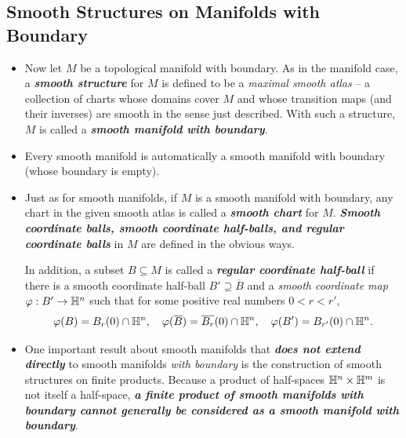\documentclass[11pt]{article}
\begin{document}
\subsection{Smooth Structures on Manifolds with Boundary}
\begin{itemize}
\item \begin{definition}
Now let $M$ be a topological manifold with boundary. As in the manifold case, a \emph{\textbf{smooth structure}} for $M$ is defined to be a \emph{maximal smooth atlas} -- a collection of charts whose domains cover $M$ and whose transition maps (and their inverses) are smooth in the sense just described. With such a structure, $M$ is called a \emph{\textbf{smooth manifold with boundary}}. 
\end{definition}

\item Every smooth manifold is automatically a smooth manifold with boundary (whose boundary is empty).

\item \begin{definition}
Just as for smooth manifolds, if $M$ is a smooth manifold with boundary, any chart in the given smooth atlas is called a \emph{\textbf{smooth chart}} for $M$. \emph{\textbf{Smooth coordinate balls, smooth coordinate half-balls, and regular coordinate balls}} in $M$ are defined in the obvious ways. 

In addition, a subset $B \subseteq M$ is called a \emph{\textbf{regular coordinate half-ball}} if there is a smooth coordinate half-ball 
$B' \supseteq \overline{B}$ and a \emph{smooth coordinate map} $\varphi: B' \rightarrow {\mathbb H}^n$ such that for some positive real numbers $0< r < r'$,
\begin{align*}
\varphi(B) = B_{r}(0)\cap {\mathbb H}^{n}, \quad \varphi(\overline{B}) = \overline{B_{r}}(0)\cap {\mathbb H}^{n}, \quad \varphi(B') = B_{r'}(0)\cap {\mathbb H}^{n}.
\end{align*}
\end{definition}

\item One important result about smooth manifolds that \emph{\textbf{does not extend directly}} to smooth manifolds \emph{with boundary} is the construction of smooth structures on finite products. Because a product of half-spaces ${\mathbb H}^n \times {\mathbb H}^m$ is not itself a half-space, \emph{\textbf{a finite product of smooth manifolds with boundary cannot generally be considered as a smooth manifold with boundary}}.


\end{itemize}
\end{document}
